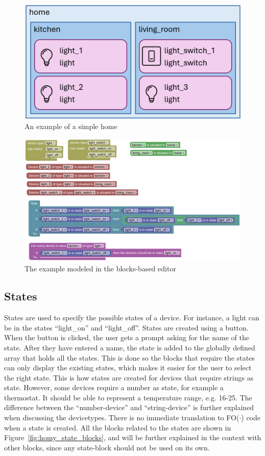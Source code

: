 \documentclass[11pt,a4paper]{report}
\newcommand{\fodot}{FO($\cdot$)\xspace}
\begin{document}
\begin{figure}
    \centering
    \includegraphics[width=0.8\linewidth]{images/custom_blocks_example.png}
    \caption{An example of a simple home}
    \label{fig:custom_blocks_example}
\end{figure}

\begin{figure}
    \centering
    \includegraphics[width=0.8\linewidth]{images/homy_example.png}
    \caption{The example modeled in the blocks-based editor}
    \label{fig:homy_example}
\end{figure}

\subsection{States}
States are used to specify the possible states of a device. For instance, a light can be in the states ``light\_on'' and ``light\_off''. States are created using a button. When the button is clicked, the user gets a prompt asking for the name of the state. After they have entered a name, the state is added to the globally defined array that holds all the states. This is done so the blocks that require the states can only display the existing states, which makes it easier for the user to select the right state. This is how states are created for devices that require strings as state. However, some devices require a number as state, for example a thermostat. It should be able to represent a temperature range, e.g. 16-25. The difference between the ``number-device'' and ``string-device'' is further explained when discussing the devicetypes. There is no immediate translation to \fodot code when a state is created. All the blocks related to the states are shown in Figure~\ref{fig:homy_state_blocks}, and will be further explained in the context with other blocks, since any state-block should not be used on its own.
\end{document}
